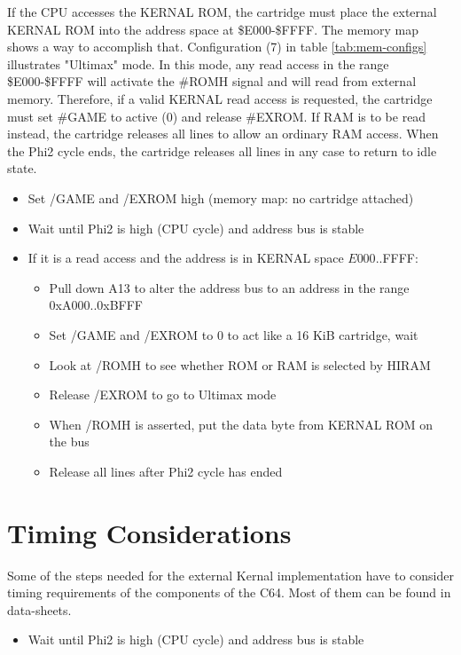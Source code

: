 \documentclass[a4paper]{memoir}
\begin{document}
If the CPU accesses the KERNAL ROM, the cartridge must place the external KERNAL ROM into the address space at \$E000-\$FFFF.
The memory map shows a way to accomplish that.
Configuration (7) in table \ref {tab:mem-configs} illustrates "Ultimax" mode.
In this mode, any read access in the range \$E000-\$FFFF will activate the \#ROMH signal and will read from external memory.
Therefore, if a valid KERNAL read access is requested, the cartridge must set \#GAME to active (0) and release \#EXROM.
If RAM is to be read instead, the cartridge releases all lines to allow an ordinary RAM access.
When the Phi2 cycle ends, the cartridge releases all lines in any case to return to idle state.

\begin{itemize}
\item Set /GAME and /EXROM high (memory map: no cartridge attached)
\item Wait until Phi2 is high (CPU cycle) and address bus is stable
\item If it is a read access and the address is in KERNAL space $E000..$FFFF:
    \begin{itemize}
    \item Pull down A13 to alter the address bus to an address in the range 0xA000..0xBFFF
    \item Set /GAME and /EXROM to 0 to act like a 16 KiB cartridge, wait
    \item Look at /ROMH to see whether ROM or RAM is selected by HIRAM
    \item Release /EXROM to go to Ultimax mode
    \item When /ROMH is asserted, put the data byte from KERNAL ROM on the bus
    \item Release all lines after Phi2 cycle has ended
    \end{itemize}
\end{itemize}

\section{Timing Considerations}

Some of the steps needed for the external Kernal implementation have
to consider timing requirements of the components of the C64. Most
of them can be found in data-sheets.

\begin{itemize}
\item Wait until Phi2 is high (CPU cycle) and address bus is stable
\end{itemize}
\end{document}
